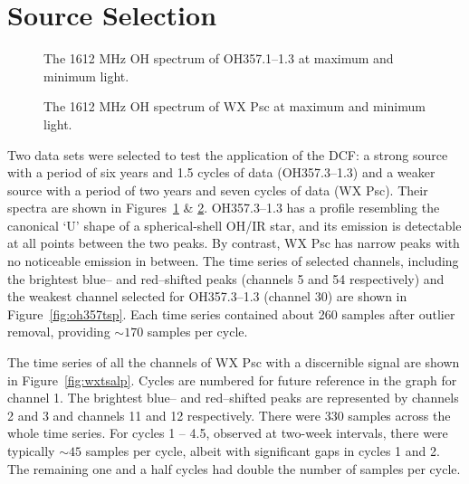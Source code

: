 \documentclass[usenatbib,usegraphicx]{mn2e}
\begin{document}
\section{Source Selection}


\begin{figure}
\resizebox{\hsize}{!}{\texttt{[image: oh357sp.ps]}}
\caption{The 1612 MHz OH spectrum of OH357.1--1.3 at maximum and
minimum light.}
\label{fig:oh357sp}
\end{figure}

\begin{figure}
\caption{The 1612 MHz OH spectrum of WX Psc at maximum and minimum
light.}
\label{fig:wxpscsp}
\end{figure}


Two data sets were selected to test the application of the DCF: a strong
source with a period of six years and 1.5 cycles of data (OH357.3--1.3) and
a weaker source with a period of two years and seven cycles of data (WX
Psc).  Their spectra are shown in Figures~\ref{fig:oh357sp} \&
\ref{fig:wxpscsp}.  OH357.3--1.3 has a profile resembling the canonical `U' 
shape of a spherical-shell OH/IR star, and its emission is detectable at all
points between the two peaks.  By contrast, WX Psc has narrow peaks with no
noticeable emission in between.
The time series of selected channels, including the brightest blue-- and
red--shifted peaks (channels 5 and 54 respectively) and the weakest channel
selected for OH357.3--1.3 (channel 30) are shown in
Figure~\ref{fig:oh357tsp}.  Each time series contained about 260 samples
after outlier removal, providing $\sim170$ samples per cycle.


\begin{figure*}
\caption{Selected time series from OH357.3-1.3: the velocity of
each channel, with the channel number in parentheses, is shown at top left.}
\label{fig:oh357tsp}
\end{figure*}


The time series of all the channels of WX Psc with a discernible signal are
shown in Figure~\ref{fig:wxtsalp}.  Cycles are numbered for future reference
in the graph for channel 1.  The brightest blue-- and red--shifted peaks are
represented by channels 2 and 3 and channels 11 and 12 respectively.  There
were 330 samples across the whole time series.  For cycles 1 -- 4.5,
observed at two-week intervals, there were typically $\sim45$ samples per
cycle, albeit with significant gaps in cycles 1 and 2.  The remaining one
and a half cycles had double the number of samples per cycle.
\end{document}
